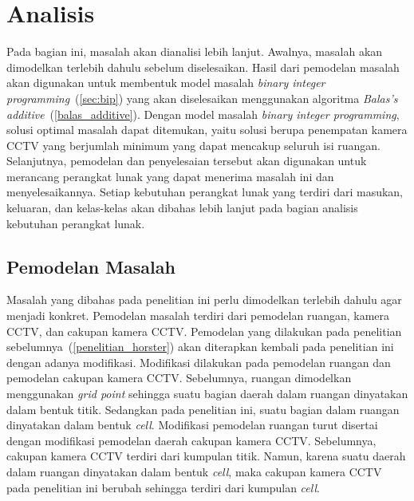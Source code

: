 \chapter{Analisis}
Pada bagian ini, masalah akan dianalisi lebih lanjut. Awalnya, masalah akan dimodelkan terlebih dahulu sebelum diselesaikan. Hasil dari pemodelan masalah akan digunakan untuk membentuk model masalah \textit{binary integer programming}~(\ref{sec:bip}) yang akan diselesaikan menggunakan algoritma \textit{Balas's additive}~(\ref{balas_additive}). Dengan model masalah \textit{binary integer programming}, solusi optimal masalah dapat ditemukan, yaitu solusi berupa penempatan kamera CCTV yang berjumlah minimum yang dapat mencakup seluruh isi ruangan. Selanjutnya, pemodelan dan penyelesaian tersebut akan digunakan untuk merancang perangkat lunak yang dapat menerima masalah ini dan menyelesaikannya. Setiap kebutuhan perangkat lunak yang terdiri dari masukan, keluaran, dan kelas-kelas akan dibahas lebih lanjut pada bagian analisis kebutuhan perangkat lunak.

\section{Pemodelan Masalah}
Masalah yang dibahas pada penelitian ini perlu dimodelkan terlebih dahulu agar menjadi konkret. Pemodelan masalah terdiri dari pemodelan ruangan, kamera CCTV, dan cakupan kamera CCTV. Pemodelan yang dilakukan pada penelitian sebelumnya~(\ref{penelitian_horster}) akan diterapkan kembali pada penelitian ini dengan adanya modifikasi. Modifikasi dilakukan pada pemodelan ruangan dan pemodelan cakupan kamera CCTV. Sebelumnya, ruangan dimodelkan menggunakan \textit{grid point} sehingga suatu bagian daerah dalam ruangan dinyatakan dalam bentuk titik. Sedangkan pada penelitian ini, suatu bagian dalam ruangan dinyatakan dalam bentuk \textit{cell}. Modifikasi pemodelan ruangan turut disertai dengan modifikasi pemodelan daerah cakupan kamera CCTV. Sebelumnya, cakupan kamera CCTV terdiri dari kumpulan titik. Namun, karena suatu daerah dalam ruangan dinyatakan dalam bentuk \textit{cell}, maka cakupan kamera CCTV pada penelitian ini berubah sehingga terdiri dari kumpulan \textit{cell}.



